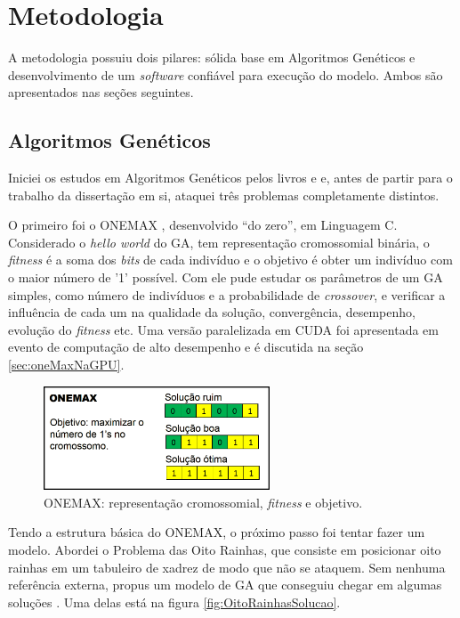 \chapter{Metodologia\label{cap:metodologia}}

	A metodologia possuiu dois pilares: sólida base em Algoritmos Genéticos e desenvolvimento de um \emph{software} confiável para execução do modelo. Ambos são apresentados nas seções seguintes.

\section{Algoritmos Genéticos}\label{seq:medologia_ga}
	
	Iniciei os estudos em Algoritmos Genéticos pelos livros \cite{Mitchell98} e \cite{Linden2008} e, antes de partir para o trabalho da dissertação em si, ataquei três problemas completamente distintos.
	
	O primeiro foi o ONEMAX \cite{onemaxNaGPU}, desenvolvido ``do zero'', em Linguagem C. Considerado o \emph{hello world} do GA, tem representação cromossomial binária, o \emph{fitness} é a soma dos \emph{bits} de cada indivíduo e o objetivo é obter um indivíduo com o maior número de '1' possível. Com ele pude estudar os parâmetros de um GA simples, como número de indivíduos e a probabilidade de \emph{crossover}, e verificar a influência de cada um na qualidade da solução, convergência, desempenho, evolução do \emph{fitness} etc. Uma versão paralelizada em CUDA foi apresentada em evento de computação de alto desempenho \cite{ERAD12} e é discutida na seção \ref{sec:oneMaxNaGPU}.
	
	\begin{figure}[htbp]
		\centering
			\includegraphics[width=0.60\textwidth]{figs/resultados/onemax/onemax_objetivo.png}
		\caption{ONEMAX: representação cromossomial, \emph{fitness} e objetivo.}
		\label{fig:onemax_objetivo_metodologia}
	\end{figure}
	
	Tendo a estrutura básica do ONEMAX, o próximo passo foi tentar fazer um modelo. Abordei o Problema das Oito Rainhas, que consiste em posicionar oito rainhas em um tabuleiro de xadrez de modo que não se ataquem. Sem nenhuma referência externa, propus um modelo de GA que conseguiu chegar em algumas soluções \cite{qualificacao_adriano}. Uma delas está na figura \ref{fig:OitoRainhasSolucao}.
	
